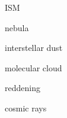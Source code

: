 \documentclass{article}
\begin{document}
\gls{ISM}

\gls{nebula}

\gls{interstellar dust}

\gls{molecular cloud}

\gls{reddening}

\gls{cosmic rays}

\clearpage

\printglossaries
\end{document}
